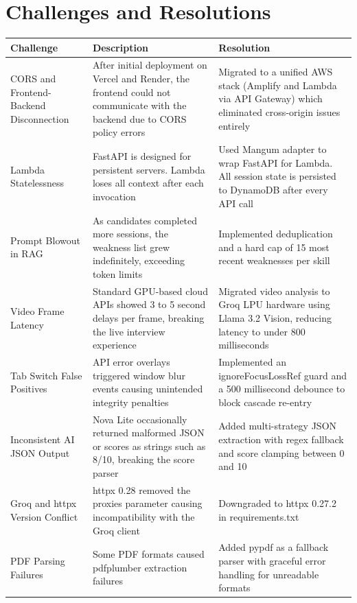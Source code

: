 \documentclass[12pt,a4paper]{article}
\begin{document}
\section{Challenges and Resolutions}

\begin{longtable}{|p{3.5cm}|p{5cm}|p{5cm}|}
\hline
\textbf{Challenge} & \textbf{Description} & \textbf{Resolution} \\
\hline
CORS and Frontend-Backend Disconnection & After initial deployment on Vercel and Render, the frontend could not communicate with the backend due to CORS policy errors & Migrated to a unified AWS stack (Amplify and Lambda via API Gateway) which eliminated cross-origin issues entirely \\
\hline
Lambda Statelessness & FastAPI is designed for persistent servers. Lambda loses all context after each invocation & Used Mangum adapter to wrap FastAPI for Lambda. All session state is persisted to DynamoDB after every API call \\
\hline
Prompt Blowout in RAG & As candidates completed more sessions, the weakness list grew indefinitely, exceeding token limits & Implemented deduplication and a hard cap of 15 most recent weaknesses per skill \\
\hline
Video Frame Latency & Standard GPU-based cloud APIs showed 3 to 5 second delays per frame, breaking the live interview experience & Migrated video analysis to Groq LPU hardware using Llama 3.2 Vision, reducing latency to under 800 milliseconds \\
\hline
Tab Switch False Positives & API error overlays triggered window blur events causing unintended integrity penalties & Implemented an ignoreFocusLossRef guard and a 500 millisecond debounce to block cascade re-entry \\
\hline
Inconsistent AI JSON Output & Nova Lite occasionally returned malformed JSON or scores as strings such as 8/10, breaking the score parser & Added multi-strategy JSON extraction with regex fallback and score clamping between 0 and 10 \\
\hline
Groq and httpx Version Conflict & httpx 0.28 removed the proxies parameter causing incompatibility with the Groq client & Downgraded to httpx 0.27.2 in requirements.txt \\
\hline
PDF Parsing Failures & Some PDF formats caused pdfplumber extraction failures & Added pypdf as a fallback parser with graceful error handling for unreadable formats \\
\hline
\end{longtable}
\end{document}
